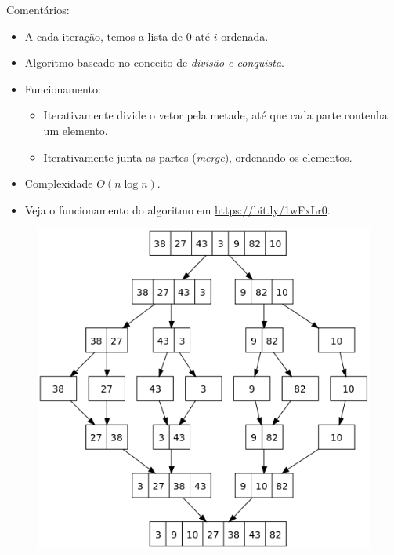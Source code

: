 {\color{redtext}
	Comentários:
	\begin{itemize}
		\item A cada iteração, temos a lista de $0$ até $i$ ordenada.
	\end{itemize}
}

\medskip


\begin{itemize}
	\item Algoritmo baseado no conceito de \textit{divisão e conquista}.
	\item Funcionamento:
	\begin{itemize}
		\item Iterativamente divide o vetor pela metade, até que cada parte contenha um elemento.
		\item Iterativamente junta as partes (\textit{merge}), ordenando os elementos.
	\end{itemize}
	\item Complexidade $O(n \log n)$.
	\item Veja o funcionamento do algoritmo em \url{https://bit.ly/1wFxLr0}.
\end{itemize}

\medskip

\begin{figure}[H]
	\centering
	\includegraphics[width=0.47\linewidth]{img/merge-sort}
\end{figure}

\medskip

